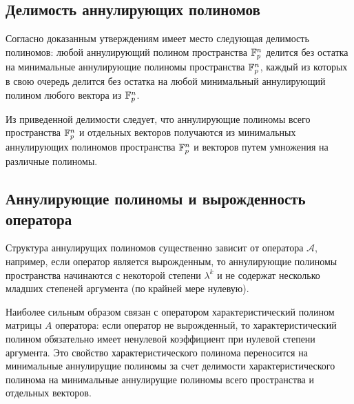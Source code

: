 \subsection{Делимость аннулирующих полиномов}

Согласно доказанным утверждениям имеет место следующая делимость полиномов: любой аннулирующий полином пространства $\mathbb{F}^{n}_p$
делится без остатка на минимальные аннулирующие полиномы пространства $\mathbb{F}^{n}_p$, каждый из которых в свою очередь делится без
остатка на любой минимальный аннулирующий полином любого вектора из $\mathbb{F}^{n}_p$.

Из приведенной делимости следует, что аннулирующие полиномы всего пространства $\mathbb{F}^{n}_p$ и отдельных векторов получаются из
минимальных аннулирующих полиномов пространства $\mathbb{F}^{n}_p$ и векторов путем умножения на различные полиномы.

\subsection{Аннулирующие полиномы и вырожденность оператора}

Структура аннулирущих полиномов существенно зависит от оператора $\mathcal A$, например, если оператор является вырожденным, то
аннулирующие полиномы пространства начинаются с некоторой степени $\lambda^k$ и не содержат несколько младших степеней аргумента
(по крайней мере нулевую).

Наиболее сильным образом связан с оператором характеристический полином матрицы $A$ оператора: если оператор не вырожденный, то
характеристический полином обязательно имеет ненулевой коэффициент при нулевой степени аргумента. Это свойство характеристического полинома
переносится на минимальные аннулирущие полиномы за счет делимости характеристического полинома на минимальные аннулирущие
полиномы всего пространства и отдельных векторов.

